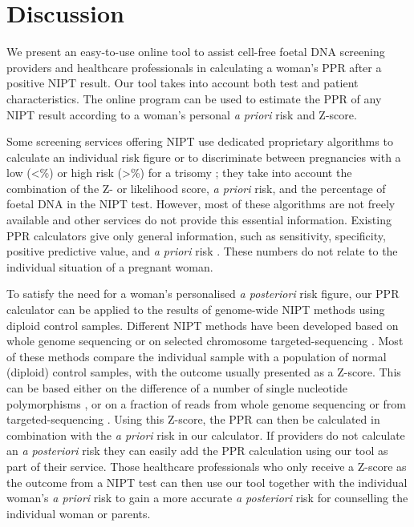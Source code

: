 \section{Discussion}\label{discussion}
We present an easy-to-use online tool to assist cell-free foetal DNA screening providers and healthcare professionals in calculating a woman’s PPR after a positive NIPT result. 
Our tool takes into account both test and patient characteristics. 
The online program can be used to estimate the PPR of any NIPT result according to a woman’s personal \textsl{a priori} risk and Z-score.

Some screening services offering NIPT use dedicated proprietary algorithms to calculate an individual risk figure \cite{Samango_Sprouse_2013} or to discriminate between pregnancies with a low (\textless{}\%) or high risk (\textgreater{}\%) for a trisomy \cite{Sparks_2012a}; they take into account the combination of the Z- or likelihood score, \textsl{a priori} risk, and the percentage of foetal DNA in the NIPT test. 
However, most of these algorithms are not freely available and other services do not provide this essential information. 
Existing PPR calculators give only general information, such as sensitivity, specificity, positive predictive value, and \textsl{a priori} risk \cite{Grace_2015,perinatalquality_org}. 
These numbers do not relate to the individual situation of a pregnant woman.

To satisfy the need for a woman’s personalised \textsl{a posteriori} risk figure, our PPR calculator can be applied to the results of genome-wide NIPT methods using diploid control samples. 
Different NIPT methods have been developed based on whole genome sequencing \cite{Fan_2008,Chiu_2008} or on selected chromosome targeted-sequencing \cite{Zimmermann_2012,Sparks_2012b}. 
Most of these methods compare the individual sample with a population of normal (diploid) control samples, with the outcome usually presented as a Z-score. This can be based either on the difference of a number of single nucleotide polymorphisms \cite{Zimmermann_2012}, or on a fraction of reads from whole genome sequencing \cite{Fan_2008,Chiu_2008} or from targeted-sequencing \cite{Sparks_2012b}. 
Using this Z-score, the PPR can then be calculated in combination with the \textsl{a priori} risk in our calculator. If providers do not calculate an \textsl{a posteriori} risk they can easily add the PPR calculation using our tool as part of their service. 
Those healthcare professionals who only receive a Z-score as the outcome from a NIPT test can then use our tool together with the individual woman’s \textsl{a priori} risk to gain a more accurate \textsl{a posteriori} risk for counselling the individual woman or parents.

